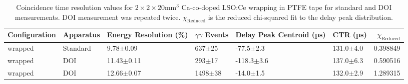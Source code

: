 \begin{table}
\caption{\label{tab:referencevals} Coincidence time resolution values for $2\times2\times20$mm$^3$ Ca-co-doped LSO:Ce wrapping in PTFE tape for standard and DOI measurements. DOI measurement was repeated twice. $\chi_\text{Reduced}$ is the reduced chi-squared fit to the delay peak distribution.}
\begin{tabular}{llllllr}
Configuration &  Apparatus & Energy Resolution (\%) & $\gamma\gamma$ Events & Delay Peak Centroid (ps) & CTR (ps) &  $\chi_\text{Reduced}$ \\
\hline
      wrapped &  Standard &    9.78$\pm$0.09 &   637$\pm$25 &   -77.5$\pm$2.3 &  131.0$\pm$4.0 &    0.398849 \\
      wrapped &       DOI &   11.43$\pm$0.11 &   293$\pm$17 &  -118.3$\pm$3.6 &  137.0$\pm$6.3 &    0.590516 \\
      wrapped &       DOI &   12.66$\pm$0.07 &  1498$\pm$38 &   -14.0$\pm$1.5 &  132.0$\pm$2.9 &    1.289315 \\
\hline
\end{tabular}
\end{table}